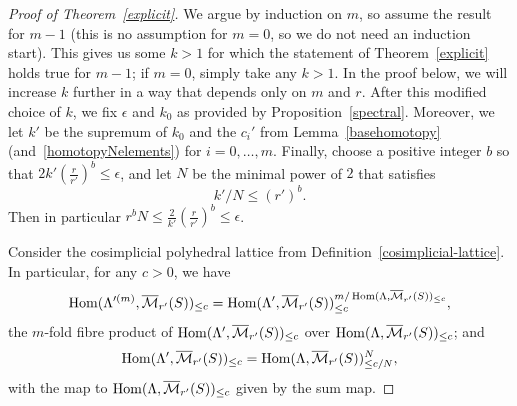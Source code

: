 \begin{proof}[Proof of Theorem~\ref{explicit}]
  We argue by induction on $m$, so assume the result for $m-1$
  (this is no assumption for $m=0$, so we do not need an induction start).
  This gives us some $k>1$ for which the statement of Theorem~\ref{explicit} holds true for $m-1$;
  if $m=0$, simply take any $k>1$.
  In the proof below, we will increase $k$ further in a way that depends only on $m$ and $r$.
  After this modified choice of $k$, we fix $\epsilon$ and $k_0$ as provided by Proposition~\ref{spectral}.
  Moreover, we let $k'$ be the supremum of $k_0$ and the $c_i'$ from
  Lemma~\ref{basehomotopy} (and~\ref{homotopyNelements}) for $i=0,\ldots,m$.
  Finally, choose a positive integer $b$ so that $2k'(\tfrac r{r'})^b\leq \epsilon$,
  and let $N$ be the minimal power of $2$ that satisfies
\[
k'/N\leq (r')^b.
\]
Then in particular $r^bN\leq \frac 2{k'}(\tfrac{r}{r'})^b\leq \epsilon$.

Consider the cosimplicial polyhedral lattice from Definition~\ref{cosimplicial-lattice}.
In particular, for any $c>0$, we have
\[
\operatorname{Hom}(\Lambda'^{(m)},\overline{\mathcal M}_{r'}(S))_{\leq c} = \operatorname{Hom}(\Lambda',\overline{\mathcal M}_{r'}(S))_{\leq c}^{m/\operatorname{Hom}(\Lambda,\overline{\mathcal M}_{r'}(S))_{\leq c}},
\]
the $m$-fold fibre product of $\operatorname{Hom}(\Lambda',\overline{\mathcal M}_{r'}(S))_{\leq c}$ over $\operatorname{Hom}(\Lambda,\overline{\mathcal M}_{r'}(S))_{\leq c}$; and
\[
\operatorname{Hom}(\Lambda',\overline{\mathcal M}_{r'}(S))_{\leq c} = \operatorname{Hom}(\Lambda,\overline{\mathcal M}_{r'}(S))_{\leq c/N}^N,
\]
with the map to $\operatorname{Hom}(\Lambda,\overline{\mathcal M}_{r'}(S))_{\leq c}$ given by the sum map.


\end{proof}
